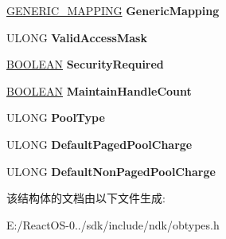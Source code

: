 \begin{DoxyCompactItemize}
\hyperlink{struct___g_e_n_e_r_i_c___m_a_p_p_i_n_g}{G\+E\+N\+E\+R\+I\+C\+\_\+\+M\+A\+P\+P\+I\+NG} {\bfseries Generic\+Mapping}
\item 
\mbox{\label{struct___o_b_j_e_c_t___t_y_p_e___i_n_f_o_r_m_a_t_i_o_n_a6f12ef7c99051fba5e865ded655c5e04}} 
U\+L\+O\+NG {\bfseries Valid\+Access\+Mask}
\item 
\mbox{\label{struct___o_b_j_e_c_t___t_y_p_e___i_n_f_o_r_m_a_t_i_o_n_a33b4519f620a4502a010e25bc70926a8}} 
\hyperlink{_processor_bind_8h_a112e3146cb38b6ee95e64d85842e380a}{B\+O\+O\+L\+E\+AN} {\bfseries Security\+Required}
\item 
\mbox{\label{struct___o_b_j_e_c_t___t_y_p_e___i_n_f_o_r_m_a_t_i_o_n_ad44b5bec861b7396ea72af3e6e7804c9}} 
\hyperlink{_processor_bind_8h_a112e3146cb38b6ee95e64d85842e380a}{B\+O\+O\+L\+E\+AN} {\bfseries Maintain\+Handle\+Count}
\item 
\mbox{\label{struct___o_b_j_e_c_t___t_y_p_e___i_n_f_o_r_m_a_t_i_o_n_a24937e90da9cd8a2f9a87271db8feed4}} 
U\+L\+O\+NG {\bfseries Pool\+Type}
\item 
\mbox{\label{struct___o_b_j_e_c_t___t_y_p_e___i_n_f_o_r_m_a_t_i_o_n_a0d60a40c2e4e819949e089926229f099}} 
U\+L\+O\+NG {\bfseries Default\+Paged\+Pool\+Charge}
\item 
\mbox{\label{struct___o_b_j_e_c_t___t_y_p_e___i_n_f_o_r_m_a_t_i_o_n_a1541cc021ac8ae28a62fc9c228f581fe}} 
U\+L\+O\+NG {\bfseries Default\+Non\+Paged\+Pool\+Charge}
\end{DoxyCompactItemize}


该结构体的文档由以下文件生成\+:\begin{DoxyCompactItemize}
\item 
E\+:/\+React\+O\+S-\/0../sdk/include/ndk/obtypes.\+h\end{DoxyCompactItemize}
